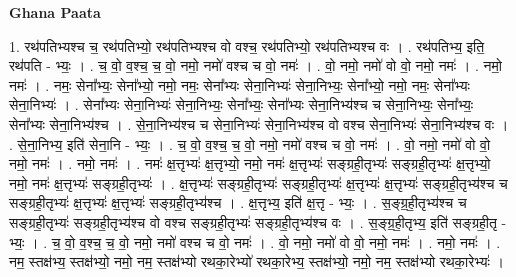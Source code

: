 \documentclass[17pt]{extarticle}
\begin{document}
\textbf{Ghana Paata } \newline

1. रथ॑पतिभ्यश्च च॒ रथ॑पतिभ्यो॒ रथ॑पतिभ्यश्च वो वश्च॒ रथ॑पतिभ्यो॒ रथ॑पतिभ्यश्च वः । . रथ॑पतिभ्य॒ इति॒ रथ॑पति - भ्यः॒ । . च॒ वो॒ व॒श्च॒ च॒ वो॒ नमो॒ नमो॑ वश्च च वो॒ नमः॑ । . वो॒ नमो॒ नमो॑ वो वो॒ नमो॒ नमः॑ । . नमो॒ नमः॑ । . नमः॒ सेना᳚भ्यः॒ सेना᳚भ्यो॒ नमो॒ नमः॒ सेना᳚भ्यः सेना॒निभ्यः॑ सेना॒निभ्यः॒ सेना᳚भ्यो॒ नमो॒ नमः॒ सेना᳚भ्यः सेना॒निभ्यः॑ । . सेना᳚भ्यः सेना॒निभ्यः॑ सेना॒निभ्यः॒ सेना᳚भ्यः॒ सेना᳚भ्यः सेना॒निभ्य॑श्च च सेना॒निभ्यः॒ सेना᳚भ्यः॒ सेना᳚भ्यः सेना॒निभ्य॑श्च । . से॒ना॒निभ्य॑श्च च सेना॒निभ्यः॑ सेना॒निभ्य॑श्च वो वश्च सेना॒निभ्यः॑ सेना॒निभ्य॑श्च वः । . से॒ना॒निभ्य॒ इति॑ सेना॒नि - भ्यः॒ । . च॒ वो॒ व॒श्च॒ च॒ वो॒ नमो॒ नमो॑ वश्च च वो॒ नमः॑ । . वो॒ नमो॒ नमो॑ वो वो॒ नमो॒ नमः॑ । . नमो॒ नमः॑ । . नमः॑ क्ष॒त्तृभ्यः॑ क्ष॒त्तृभ्यो॒ नमो॒ नमः॑ क्ष॒त्तृभ्यः॑ सङ्ग्रही॒तृभ्यः॑ सङ्ग्रही॒तृभ्यः॑ क्ष॒त्तृभ्यो॒ नमो॒ नमः॑ क्ष॒त्तृभ्यः॑ सङ्ग्रही॒तृभ्यः॑ । . क्ष॒त्तृभ्यः॑ सङ्ग्रही॒तृभ्यः॑ सङ्ग्रही॒तृभ्यः॑ क्ष॒त्तृभ्यः॑ क्ष॒त्तृभ्यः॑ सङ्ग्रही॒तृभ्य॑श्च च सङ्ग्रही॒तृभ्यः॑ क्ष॒त्तृभ्यः॑ क्ष॒त्तृभ्यः॑ सङ्ग्रही॒तृभ्य॑श्च । . क्ष॒त्तृभ्य॒ इति॑ क्ष॒त्तृ - भ्यः॒ । . स॒ङ्ग्र॒ही॒तृभ्य॑श्च च सङ्ग्रही॒तृभ्यः॑ सङ्ग्रही॒तृभ्य॑श्च वो वश्च सङ्ग्रही॒तृभ्यः॑ सङ्ग्रही॒तृभ्य॑श्च वः । . स॒ङ्ग्र॒ही॒तृभ्य॒ इति॑ सङ्ग्रही॒तृ - भ्यः॒ । . च॒ वो॒ व॒श्च॒ च॒ वो॒ नमो॒ नमो॑ वश्च च वो॒ नमः॑ । . वो॒ नमो॒ नमो॑ वो वो॒ नमो॒ नमः॑ । . नमो॒ नमः॑ । . नम॒ स्तक्ष॑भ्य॒ स्तक्ष॑भ्यो॒ नमो॒ नम॒ स्तक्ष॑भ्यो रथका॒रेभ्यो॑ रथका॒रेभ्य॒ स्तक्ष॑भ्यो॒ नमो॒ नम॒ स्तक्ष॑भ्यो रथका॒रेभ्यः॑ । \newline
\end{document}
